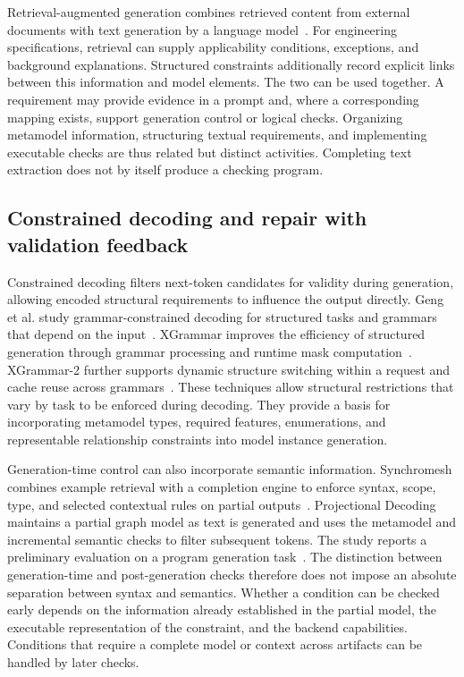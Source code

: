 \documentclass[pdflatex,iicol,sn-mathphys-num]{sn-jnl}
\newcommand{\paperref}[1]{~\citep{#1}}
\begin{document}
Retrieval-augmented generation combines retrieved content from external documents with text generation by a language model\paperref{NEURIPS2020_6b493230}. For engineering specifications, retrieval can supply applicability conditions, exceptions, and background explanations. Structured constraints additionally record explicit links between this information and model elements. The two can be used together. A requirement may provide evidence in a prompt and, where a corresponding mapping exists, support generation control or logical checks. Organizing metamodel information, structuring textual requirements, and implementing executable checks are thus related but distinct activities. Completing text extraction does not by itself produce a checking program.

\subsection{Constrained decoding and repair with validation feedback}\label{sec:related-2-4}

Constrained decoding filters next-token candidates for validity during generation, allowing encoded structural requirements to influence the output directly. Geng et al. study grammar-constrained decoding for structured tasks and grammars that depend on the input\paperref{geng-etal-2023-grammar}. XGrammar improves the efficiency of structured generation through grammar processing and runtime mask computation\paperref{MLSYS2025_5c20ca4b}. XGrammar-2 further supports dynamic structure switching within a request and cache reuse across grammars\paperref{Li_2026}. These techniques allow structural restrictions that vary by task to be enforced during decoding. They provide a basis for incorporating metamodel types, required features, enumerations, and representable relationship constraints into model instance generation.

Generation-time control can also incorporate semantic information. Synchromesh combines example retrieval with a completion engine to enforce syntax, scope, type, and selected contextual rules on partial outputs\paperref{poesia2022synchromesh}. Projectional Decoding maintains a partial graph model as text is generated and uses the metamodel and incremental semantic checks to filter subsequent tokens. The study reports a preliminary evaluation on a program generation task\paperref{Chen_2026}. The distinction between generation-time and post-generation checks therefore does not impose an absolute separation between syntax and semantics. Whether a condition can be checked early depends on the information already established in the partial model, the executable representation of the constraint, and the backend capabilities. Conditions that require a complete model or context across artifacts can be handled by later checks.
\end{document}
